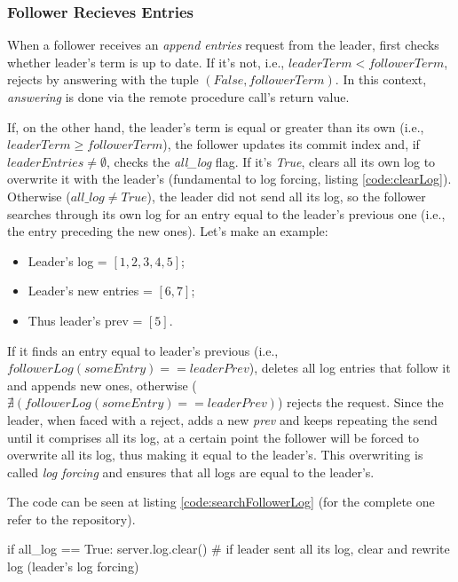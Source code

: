 \subsubsection{Follower Recieves Entries}

When a follower receives an \textit{append entries} request from the leader, first checks whether leader's term is up to date. If it's not, i.e., $leaderTerm < followerTerm$, rejects by answering with the tuple $(False, followerTerm)$. In this context, \textit{answering} is done via the remote procedure call's return value.

If, on the other hand, the leader's term is equal or greater than its own (i.e., $leaderTerm \geq followerTerm$), the follower updates its commit index and, if $leaderEntries \neq \emptyset$, checks the \textit{all\_log} flag. If it's \textit{True}, clears all its own log to overwrite it with the leader's (fundamental to log forcing, listing \ref{code:clearLog}). Otherwise ($all\_log \neq True$), the leader did not send all its log, so the follower searches through its own log for an entry equal to the leader's previous one (i.e., the entry preceding the new ones). Let's make an example: 

\begin{itemize}
    \item Leader's log = $[1, 2, 3, 4, 5]$;
    \item Leader's new entries = $[6, 7]$;
    \item Thus leader's prev = $[5]$.
\end{itemize}

If it finds an entry equal to leader's previous (i.e., $followerLog(someEntry) == leaderPrev$), deletes all log entries that follow it and appends new ones, otherwise ($\nexists(followerLog(someEntry) == leaderPrev)$) rejects the request. Since the leader, when faced with a reject, adds a new \textit{prev} and keeps repeating the send until it comprises all its log, at a certain point the follower will be forced to overwrite all its log, thus making it equal to the leader's. This overwriting is called \textit{log forcing} and ensures that all logs are equal to the leader's.

The code can be seen at listing \ref{code:searchFollowerLog} (for the complete one refer to the repository).

\begin{python}[label={code:clearLog}, caption={Follower clears its own log to overwrite it with the leader's}]
if all_log == True:
    server.log.clear() # if leader sent all its log, clear and rewrite log (leader's log forcing)
\end{python}


